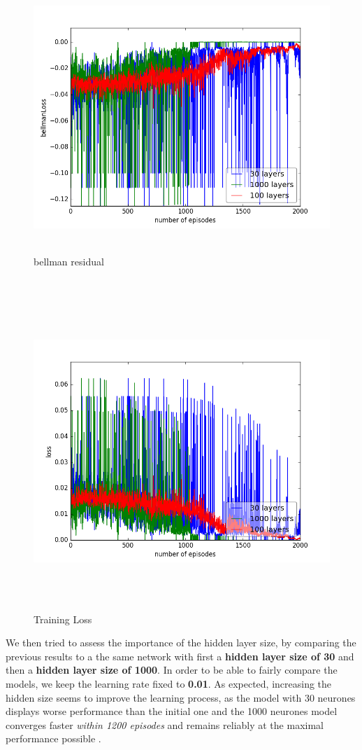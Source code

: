 \documentclass{report}
\begin{document}
\begin{figure}[H]
    \begin{minipage}[c]{.49\linewidth}
        \centering
        \includegraphics[width = \linewidth]{plots/a5/bellmanLoss.png}
        \caption{bellman residual}
    \end{minipage}
    \hfill%
    \begin{minipage}[c]{.49\linewidth}
        \centering
        \includegraphics[width = \linewidth]{plots/a5/loss.png}
        \caption{Training Loss}
    \end{minipage}
\end{figure}


We then tried to assess the importance of the hidden layer size, by comparing the previous results to a the same network with first a \textbf{hidden layer size of 30} and then a \textbf{hidden layer size of 1000}. In order to be able to fairly compare the models, we keep the learning rate fixed to  \textbf{0.01}. As expected, increasing the hidden size seems to improve the learning process, as the model with 30 neurones displays worse performance than the initial one and the 1000 neurones model converges faster \textit{within 1200 episodes} and remains reliably at the maximal performance possible . 
\end{document}
